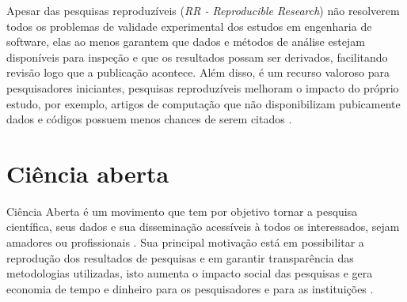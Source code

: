 Apesar das pesquisas reproduzíveis ({\it RR - Reproducible Research}) não
resolverem todos os problemas de validade experimental dos estudos em
engenharia de software, elas ao menos garantem que dados e métodos de análise
estejam disponíveis para inspeção e que os resultados possam ser derivados,
facilitando revisão logo que a publicação acontece. Além disso, é um recurso
valoroso para pesquisadores iniciantes, pesquisas reproduzíveis melhoram o
impacto do próprio estudo, por exemplo, artigos de computação que não
disponibilizam pubicamente dados e códigos possuem menos chances de serem
citados \cite{madeyski2017would}.


\section{Ciência aberta}

Ciência Aberta é um movimento que tem por objetivo tornar a pesquisa
científica, seus dados e sua disseminação acessíveis à todos os interessados,
sejam amadores ou profissionais \cite{WikipediaOpenScience}. Sua principal
motivação está em possibilitar a reprodução dos resultados de pesquisas e em
garantir transparência das metodologias utilizadas, isto aumenta o impacto
social das pesquisas e gera economia de tempo e dinheiro para os pesquisadores
e para as instituições \cite{Nesta2010}.

